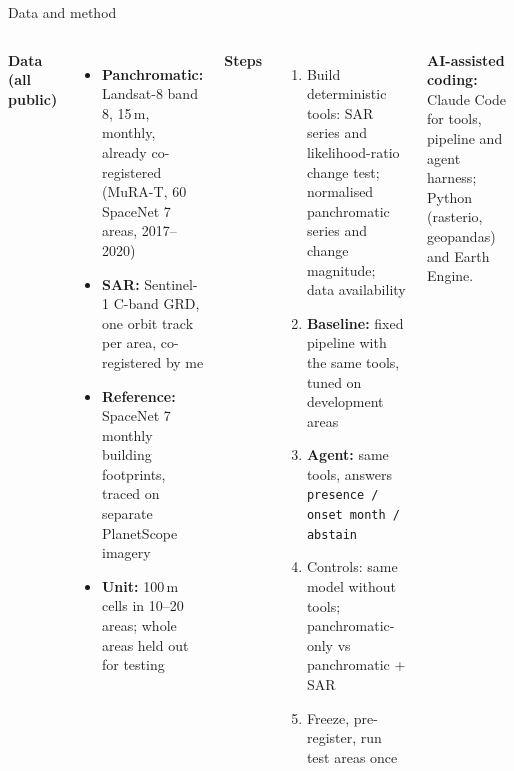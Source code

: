 \documentclass[aspectratio=169,11pt]{beamer}
\begin{document}
\begin{frame}[shrink=18]{Data and method}
\begin{columns}[T,onlytextwidth]
\textbf{Data (all public)}
\begin{itemize}\small
  \item \textbf{Panchromatic:} Landsat-8 band 8, 15\,m, monthly, already co-registered (MuRA-T, 60 SpaceNet 7 areas, 2017--2020)
  \item \textbf{SAR:} Sentinel-1 C-band GRD, one orbit track per area, co-registered by me
  \item \textbf{Reference:} SpaceNet 7 monthly building footprints, traced on separate PlanetScope imagery
  \item \textbf{Unit:} 100\,m cells in 10--20 areas; whole areas held out for testing
\end{itemize}
\textbf{Steps}
\begin{enumerate}\small
  \item Build deterministic tools: SAR series and likelihood-ratio change test; normalised panchromatic series and change magnitude; data availability
  \item \textbf{Baseline:} fixed pipeline with the same tools, tuned on development areas
  \item \textbf{Agent:} same tools, answers \texttt{presence / onset month / abstain}
  \item Controls: same model without tools; panchromatic-only vs panchromatic + SAR
  \item Freeze, pre-register, run test areas once
\end{enumerate}
\textbf{AI-assisted coding:} Claude Code for tools, pipeline and agent harness; Python (rasterio, geopandas) and Earth Engine.
\end{columns}
\end{frame}
\end{document}
